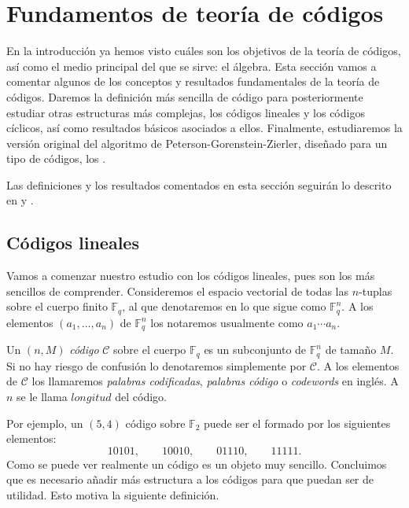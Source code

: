 \chapter{Fundamentos de teoría de códigos}

En la introducción ya hemos visto cuáles son los objetivos de la teoría de códigos, así como el medio principal del que se sirve: el álgebra.
Esta sección vamos a comentar algunos de los conceptos y resultados fundamentales de la teoría de códigos.
Daremos la definición más sencilla de código para posteriormente estudiar otras estructuras más complejas, los códigos lineales y los códigos cíclicos, así como resultados básicos asociados a ellos.
Finalmente, estudiaremos la versión original del algoritmo de Peterson-Gorenstein-Zierler, diseñado para un tipo de códigos, los .

Las definiciones y los resultados comentados en esta sección seguirán lo descrito en \parencite[cap. 1, 3-5]{huffman_fundamentals_2003} y \parencite{podesta_introduccion_2006}.

\section{Códigos lineales}

Vamos a comenzar nuestro estudio con los códigos lineales, pues son los más sencillos de comprender. 
Consideremos el espacio vectorial de todas las \(n\)-tuplas sobre el cuerpo finito \(\mathbb F_q\), al que denotaremos en lo que sigue como \(\mathbb F_q^n\). 
A los elementos \((a_1, \dots, a_n)\) de \(\mathbb F_q^n\) los notaremos usualmente como \(a_1\!\cdots a_n\).

\begin{definition}
  Un \((n, M)\) \textit{código} \(\mathcal C\) sobre el cuerpo \(\mathbb F_q\) es un subconjunto de \(\mathbb F_q^n\) de tamaño \(M\). 
  Si no hay riesgo de confusión lo denotaremos simplemente por \(\mathcal C\). 
  A los elementos de \(\mathcal C\) los llamaremos \textit{palabras codificadas}, \textit{palabras código} o \textit{codewords} en inglés.
  A \(n\) se le llama \(longitud\) del código.
\end{definition}

Por ejemplo, un \((5,4)\) código sobre \(\mathbb F_2\) puede ser el formado por los siguientes elementos: \[
  10101,\qquad
  10010,\qquad
  01110,\qquad
  11111.
\]
Como se puede ver realmente un código es un objeto muy sencillo.
Concluimos que es necesario añadir más estructura a los códigos para que puedan ser de utilidad.
Esto motiva la siguiente definición.

